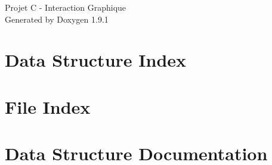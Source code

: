 \let\mypdfximage\pdfximage\def\pdfximage{\immediate\mypdfximage}\documentclass[twoside]{book}
\newcommand{\+}{\discretionary{\mbox{\scriptsize$\hookleftarrow$}}{}{}}
\newcommand{\clearemptydoublepage}{%
  \newpage{\pagestyle{empty}\cleardoublepage}%
}
\begin{document}
\raggedbottom

\hypersetup{pageanchor=false,
             bookmarksnumbered=true,
             pdfencoding=unicode
            }
\begin{titlepage}
\vspace*{7cm}
\begin{center}%
{\Large Projet C -\/ Interaction Graphique }\\
\vspace*{1cm}
{\large Generated by Doxygen 1.9.1}\\
\end{center}
\end{titlepage}
\clearemptydoublepage
{}
\tableofcontents
\clearemptydoublepage
{}
\hypersetup{pageanchor=true}

\chapter{Data Structure Index}

\chapter{File Index}

\chapter{Data Structure Documentation}
















\end{document}

